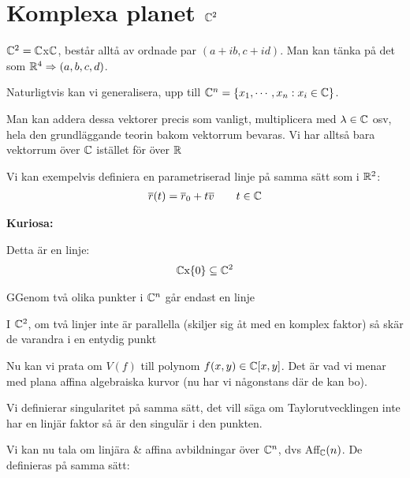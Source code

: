 \section{Komplexa planet $\mathbb{C}^2$}
\par\bigskip
\noindent $\mathbb{C}^2 = \mathbb{C}$x$\mathbb{C}$, består alltå av ordnade par $(a+ib, c+id)$. Man kan tänka på det som $\mathbb{R}^4\Rightarrow (a,b,c,d)$.\par
\noindent Naturligtvis kan vi generalisera, upp till $\mathbb{C}^n  = \{x_1,\cdots,x_n : x_i\in\mathbb{C}\}$.\par
\noindent Man kan addera dessa vektorer precis som vanligt, multiplicera med $\lambda\in\mathbb{C}$ osv, hela den grundläggande teorin bakom vektorrum bevaras. Vi har alltså bara vektorrum över $\mathbb{C}$ istället för över $\mathbb{R}$
\par\bigskip
\noindent Vi kan exempelvis definiera en parametriserad linje på samma sätt som i $\mathbb{R}^2$:
\begin{equation*}
  \begin{gathered}
    \overline{r}(t) = \overline{r}_0+t\overline{v}\qquad t\in\mathbb{C}
  \end{gathered}
\end{equation*}
\par\bigskip
\noindent\textbf{Kuriosa:}\par
\noindent Detta är en linje:
\begin{equation*}
  \begin{gathered}
    \mathbb{C}\text{x}\{0\}\subseteq\mathbb{C}^2
  \end{gathered}
\end{equation*}
\par\bigskip
\begin{theo}
  GGenom två olika punkter i $\mathbb{C}^n$ går endast en linje
\end{theo}
\par\bigskip
\begin{theo}
  I $\mathbb{C}^2$, om två linjer inte är parallella (skiljer sig åt med en komplex faktor) så skär de varandra i en entydig punkt
\end{theo}
\par\bigskip
\noindent Nu kan vi prata om $V(f)$ till polynom $f(x,y)\in\mathbb{C}[x,y]$. Det är vad vi menar med plana affina algebraiska kurvor (nu har vi någonstans där de kan bo).
\par\bigskip
\noindent Vi definierar singularitet på samma sätt, det vill säga om Taylorutvecklingen inte har en linjär faktor så är den singulär i den punkten.
\par\bigskip
\noindent Vi kan nu tala om linjära \& affina avbildningar över $\mathbb{C}^n$, dvs Aff$_{\mathbb{C}}(n)$. De definieras på samma sätt:
